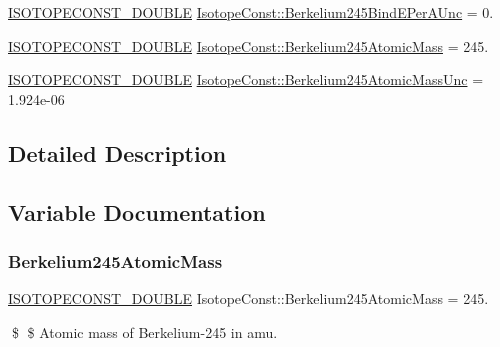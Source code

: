 \begin{DoxyCompactItemize}
\mbox{\hyperlink{group___isotope_const-_macros_ga8f45a7272ce02c0b4c65c44636ed719a}{I\+S\+O\+T\+O\+P\+E\+C\+O\+N\+S\+T\+\_\+\+D\+O\+U\+B\+LE}} \mbox{\hyperlink{group___isotope_const-_berkelium-_bk245_ga3a01f92cef53f1eeb8093d0056770b32}{Isotope\+Const\+::\+Berkelium245\+Bind\+E\+Per\+A\+Unc}} = 0.
\item 
\mbox{\hyperlink{group___isotope_const-_macros_ga8f45a7272ce02c0b4c65c44636ed719a}{I\+S\+O\+T\+O\+P\+E\+C\+O\+N\+S\+T\+\_\+\+D\+O\+U\+B\+LE}} \mbox{\hyperlink{group___isotope_const-_berkelium-_bk245_gae36f6df248ce46ecf707b1c6108b56df}{Isotope\+Const\+::\+Berkelium245\+Atomic\+Mass}} = 245.
\item 
\mbox{\hyperlink{group___isotope_const-_macros_ga8f45a7272ce02c0b4c65c44636ed719a}{I\+S\+O\+T\+O\+P\+E\+C\+O\+N\+S\+T\+\_\+\+D\+O\+U\+B\+LE}} \mbox{\hyperlink{group___isotope_const-_berkelium-_bk245_ga67ffcb7626af7b79bd3fa814edce7d3b}{Isotope\+Const\+::\+Berkelium245\+Atomic\+Mass\+Unc}} = 1.\+924e-\/06
\end{DoxyCompactItemize}


\subsection{Detailed Description}


\subsection{Variable Documentation}
\mbox{\label{group___isotope_const-_berkelium-_bk245_gae36f6df248ce46ecf707b1c6108b56df}} 
\subsubsection{\texorpdfstring{Berkelium245\+Atomic\+Mass}{Berkelium245AtomicMass}}
{\footnotesize\ttfamily \mbox{\hyperlink{group___isotope_const-_macros_ga8f45a7272ce02c0b4c65c44636ed719a}{I\+S\+O\+T\+O\+P\+E\+C\+O\+N\+S\+T\+\_\+\+D\+O\+U\+B\+LE}} Isotope\+Const\+::\+Berkelium245\+Atomic\+Mass = 245.}

\$ \$ Atomic mass of Berkelium-\/245 in amu. \mbox{\label{group___isotope_const-_berkelium-_bk245_ga67ffcb7626af7b79bd3fa814edce7d3b}} 
